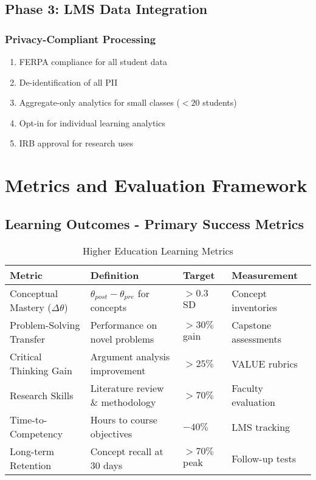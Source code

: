 \documentclass[11pt,a4paper]{report}
\begin{document}
\section{Phase 3: LMS Data Integration}

\subsection{Privacy-Compliant Processing}
\begin{enumerate}
    \item FERPA compliance for all student data
    \item De-identification of all PII
    \item Aggregate-only analytics for small classes ($<20$ students)
    \item Opt-in for individual learning analytics
    \item IRB approval for research uses
\end{enumerate}

\chapter{Metrics and Evaluation Framework}

\section{Learning Outcomes - Primary Success Metrics}

\begin{table}[H]
\centering
\caption{Higher Education Learning Metrics}
\begin{tabular}{p{4cm}p{5cm}p{2cm}p{3cm}}
\toprule
\textbf{Metric} & \textbf{Definition} & \textbf{Target} & \textbf{Measurement} \\
\midrule
Conceptual Mastery ($\Delta\theta$) & $\theta_{post} - \theta_{pre}$ for concepts & $>0.3$ SD & Concept inventories \\
Problem-Solving Transfer & Performance on novel problems & $>30\%$ gain & Capstone assessments \\
Critical Thinking Gain & Argument analysis improvement & $>25\%$ & VALUE rubrics \\
Research Skills & Literature review \& methodology & $>70\%$ & Faculty evaluation \\
Time-to-Competency & Hours to course objectives & $-40\%$ & LMS tracking \\
Long-term Retention & Concept recall at 30 days & $>70\%$ peak & Follow-up tests \\
\bottomrule
\end{tabular}
\end{table}
\end{document}
